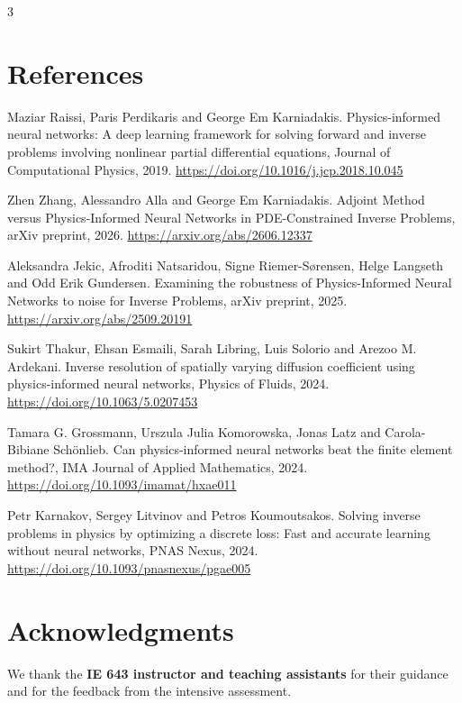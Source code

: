 \documentclass[a0,portrait]{a0poster}
\begin{document}
\begin{minipage}[c]{\linewidth}
\begin{framed}
\begin{multicols}{3}
\section*{References}
\footnotesize
\begin{enumerate}[label={[\arabic*]}, leftmargin=1.8em, itemsep=3pt]
\item Maziar Raissi, Paris Perdikaris and George Em Karniadakis. Physics-informed neural networks: A deep learning
framework for solving forward and inverse problems involving nonlinear partial differential equations, Journal of
Computational Physics, 2019. \url{https://doi.org/10.1016/j.jcp.2018.10.045}
\item Zhen Zhang, Alessandro Alla and George Em Karniadakis. Adjoint Method versus Physics-Informed Neural Networks
in PDE-Constrained Inverse Problems, arXiv preprint, 2026. \url{https://arxiv.org/abs/2606.12337}
\item Aleksandra Jekic, Afroditi Natsaridou, Signe Riemer-S{\o}rensen, Helge Langseth and Odd Erik Gundersen.
Examining the robustness of Physics-Informed Neural Networks to noise for Inverse Problems, arXiv preprint, 2025.
\url{https://arxiv.org/abs/2509.20191}
\item Sukirt Thakur, Ehsan Esmaili, Sarah Libring, Luis Solorio and Arezoo M. Ardekani. Inverse resolution of
spatially varying diffusion coefficient using physics-informed neural networks, Physics of Fluids, 2024.
\url{https://doi.org/10.1063/5.0207453}
\item Tamara G. Grossmann, Urszula Julia Komorowska, Jonas Latz and Carola-Bibiane Sch{\"o}nlieb. Can
physics-informed neural networks beat the finite element method?, IMA Journal of Applied Mathematics, 2024.
\url{https://doi.org/10.1093/imamat/hxae011}
\item Petr Karnakov, Sergey Litvinov and Petros Koumoutsakos. Solving inverse problems in physics by optimizing a
discrete loss: Fast and accurate learning without neural networks, PNAS Nexus, 2024.
\url{https://doi.org/10.1093/pnasnexus/pgae005}
\end{enumerate}
\normalsize

\section*{Acknowledgments}
\small \textnormal{We thank the \textbf{IE 643 instructor and teaching assistants} for their guidance and for the
feedback from the intensive assessment.}
\normalsize


\end{multicols}
\end{framed}
\end{minipage}
\end{document}

